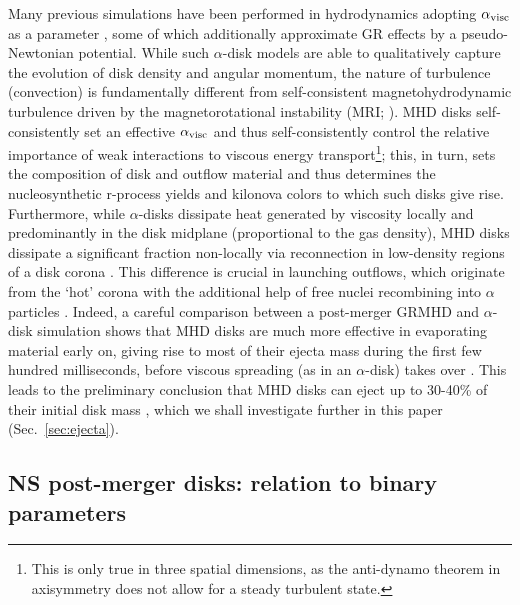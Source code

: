 Many previous simulations have been performed in hydrodynamics adopting $\alpha_{\rm visc}$ as a parameter \cite{fernandez_delayed_2013,fernandez_outflows_2015,just_comprehensive_2015,fujibayashi_properties_2017,Fujibayashi:2020qda}, some of which additionally approximate GR effects by a pseudo-Newtonian potential. While such $\alpha$-disk models are able to qualitatively capture the evolution of disk density and angular momentum, the nature of turbulence (convection) is fundamentally different from self-consistent magnetohydrodynamic turbulence driven by the magnetorotational instability (MRI; \cite{hawley_powerful_1992,balbus_nature_2002}). MHD disks self-consistently set an effective  $\alpha_{\rm visc}$ and thus self-consistently control the relative importance of weak interactions to viscous energy transport\footnote{This is only true in three spatial dimensions, as the anti-dynamo theorem in axisymmetry \cite{cowling_magnetic_1933} does not allow for a steady turbulent state.}; this, in turn, sets the composition of disk and outflow material and thus determines the nucleosynthetic r-process yields and kilonova colors to which such disks give rise. Furthermore, while $\alpha$-disks dissipate heat generated by viscosity locally and predominantly in the disk midplane (proportional to the gas density), MHD disks dissipate a significant fraction non-locally via reconnection in low-density regions of a disk corona \cite{jiang_global_2014,siegel_three-dimensional_2018}. This difference is crucial in launching outflows, which originate from the `hot' corona with the additional help of free nuclei recombining into $\alpha$ particles \cite{siegel_three-dimensional_2018}. Indeed, a careful comparison between a post-merger GRMHD and $\alpha$-disk simulation shows that MHD disks are much more effective in evaporating material early on, giving rise to most of their ejecta mass during the first few hundred milliseconds, before viscous spreading (as in an $\alpha$-disk) takes over \cite{fernandez_long-term_2019}. This leads to the preliminary conclusion that MHD disks can eject up to 30-40\% of their initial disk mass \cite{siegel_three-dimensional_2018,fernandez_long-term_2019}, which we shall investigate further in this paper (Sec.~\ref{sec:ejecta}).

\subsection{NS post-merger disks: relation to binary parameters}\label{sec:param_space}

